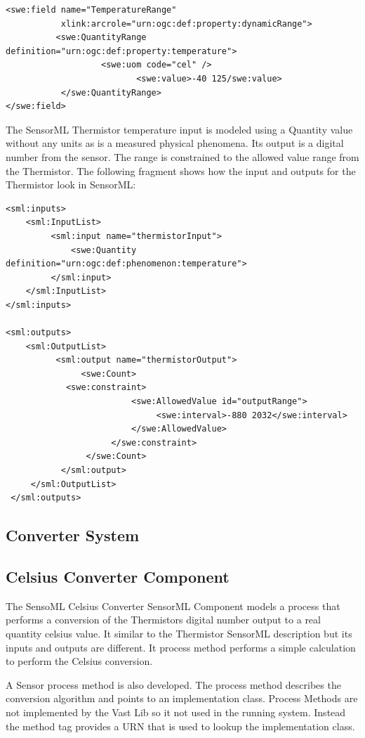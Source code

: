 \documentclass[]{final_report}
\begin{document}
\begin{lstlisting}
<swe:field name="TemperatureRange" 
           xlink:arcrole="urn:ogc:def:property:dynamicRange">
          <swe:QuantityRange definition="urn:ogc:def:property:temperature">
                   <swe:uom code="cel" /> 
                          <swe:value>-40 125/swe:value> 
           </swe:QuantityRange>
</swe:field>
\end{lstlisting}

The SensorML Thermistor temperature input is modeled using a Quantity value without any units as is a measured physical phenomena. Its output is a digital number from the sensor. The range is constrained to the allowed value range from the Thermistor. The following fragment shows how the input and outputs for the Thermistor look in SensorML:

\begin{lstlisting}
<sml:inputs>
    <sml:InputList>
         <sml:input name="thermistorInput">
             <swe:Quantity definition="urn:ogc:def:phenomenon:temperature">
         </sml:input>
    </sml:InputList>
</sml:inputs>

<sml:outputs>
    <sml:OutputList>
          <sml:output name="thermistorOutput">
               <swe:Count>
	        <swe:constraint>
                         <swe:AllowedValue id="outputRange">
                              <swe:interval>-880 2032</swe:interval>
                         </swe:AllowedValue>
                     </swe:constraint>
                </swe:Count>
           </sml:output>
     </sml:OutputList>
 </sml:outputs>
\end{lstlisting}

\subsection{Converter System}
\subsection{Celsius Converter Component}

The SensoML Celsius Converter SensorML Component  models a process that performs a conversion of the Thermistors digital number output to a real quantity celsius value. It similar to the Thermistor SensorML description but its inputs and outputs are different. It process method performs a simple calculation to perform the Celsius conversion.

A Sensor process method is also developed. The process method describes the conversion algorithm and points to an implementation class. Process Methods are not implemented by the Vast Lib so it not used in the running system. Instead the method tag provides a URN that is used to lookup the implementation class.
\end{document}
